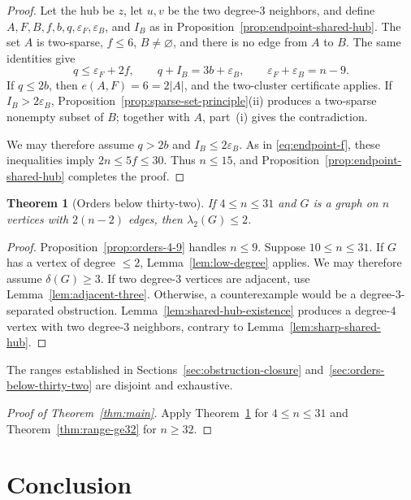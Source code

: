 \documentclass[11pt]{article}
\numberwithin{equation}{section}
\newtheorem{theorem}{Theorem}[section]
\theoremstyle{definition}
\theoremstyle{remark}
\newcommand{\ac}{\lambda_2}
\begin{document}
\begin{proof}
Let the hub be \(z\), let \(u,v\) be the two degree-\(3\) neighbors,
and define \(A,F,B,f,b,q,\varepsilon_F,\varepsilon_B\), and \(I_B\) as in
Proposition~\ref{prop:endpoint-shared-hub}.  The set \(A\) is
two-sparse, \(f\le6\), \(B\ne\varnothing\), and there is no edge from
\(A\) to \(B\).  The same identities give
\[
 q\le \varepsilon_F+2f,\qquad q+I_B=3b+\varepsilon_B,\qquad
 \varepsilon_F+\varepsilon_B=n-9.
\]
If \(q\le2b\), then \(e(A,F)=6=2|A|\), and the two-cluster
certificate applies.  If \(I_B>2\varepsilon_B\),
Proposition~\ref{prop:sparse-set-principle}(ii) produces a two-sparse
nonempty subset of \(B\); together with \(A\), part~(i) gives the
contradiction.

We may therefore assume \(q>2b\) and \(I_B\le2\varepsilon_B\).
As in \eqref{eq:endpoint-f}, these inequalities imply
\(2n\le5f\le30\).  Thus \(n\le15\), and
Proposition~\ref{prop:endpoint-shared-hub} completes the proof.
\end{proof}

\begin{theorem}[Orders below thirty-two]\label{thm:range-4-31}
If \(4\le n\le31\) and \(G\) is a graph on \(n\) vertices with
\(2(n-2)\) edges, then \(\ac(G)\le2\).
\end{theorem}

\begin{proof}
Proposition~\ref{prop:orders-4-9} handles \(n\le9\).  Suppose
\(10\le n\le31\).  If \(G\) has a vertex of degree \(\le2\),
Lemma~\ref{lem:low-degree} applies.  We may therefore assume
\(\delta(G)\ge3\).  If two degree-\(3\) vertices are adjacent, use
Lemma~\ref{lem:adjacent-three}.  Otherwise, a counterexample would be a
degree-\(3\)-separated obstruction.  Lemma~\ref{lem:shared-hub-existence}
produces a degree-\(4\) vertex with two degree-\(3\) neighbors, contrary to
Lemma~\ref{lem:sharp-shared-hub}.
\end{proof}

The ranges established in Sections~\ref{sec:obstruction-closure}
and~\ref{sec:orders-below-thirty-two} are disjoint and exhaustive.

\begin{proof}[Proof of Theorem~\ref{thm:main}]
Apply Theorem~\ref{thm:range-4-31} for \(4\le n\le31\) and
Theorem~\ref{thm:range-ge32} for \(n\ge32\).
\end{proof}

\section{Conclusion}\label{sec:conclusion}
\end{document}
